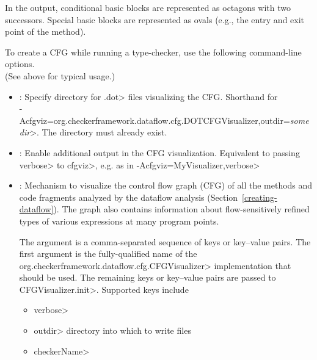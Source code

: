 In the output, conditional basic blocks are represented as octagons with
two successors.  Special basic blocks are represented as ovals (e.g., the
entry and exit point of the method).



To create a CFG while running a type-checker, use the following
command-line options. \\
(See above for typical usage.)

\begin{itemize}

\item {}:
  Specify directory for \<.dot> files visualizing the CFG\@.
  Shorthand for\\
  \<-Acfgviz=org.checkerframework.dataflow.cfg.DOTCFGVisualizer,outdir=\emph{somedir}>.
  The directory must already exist.

\item {}:
  Enable additional output in the CFG visualization.
  Equivalent to passing \<verbose> to \<cfgviz>, e.g. as in
  \<-Acfgviz=MyVisualizer,verbose>

\item {}:
  Mechanism to visualize the control flow graph (CFG) of
  all the methods and code fragments
  analyzed by the dataflow analysis (Section~\ref{creating-dataflow}).
  The graph also contains information about flow-sensitively refined
  types of various expressions at many program points.

  The argument is a comma-separated sequence of keys or key--value pairs.
  The first argument is the fully-qualified name of the
  \<org.checkerframework.dataflow.cfg.CFGVisualizer> implementation
  that should be used. The remaining keys or key--value pairs are
  passed to \<CFGVisualizer.init>.  Supported keys include
  \begin{itemize}
  \item \<verbose>
  \item \<outdir> directory into which to write files
  \item \<checkerName>
  \end{itemize}

\end{itemize}



